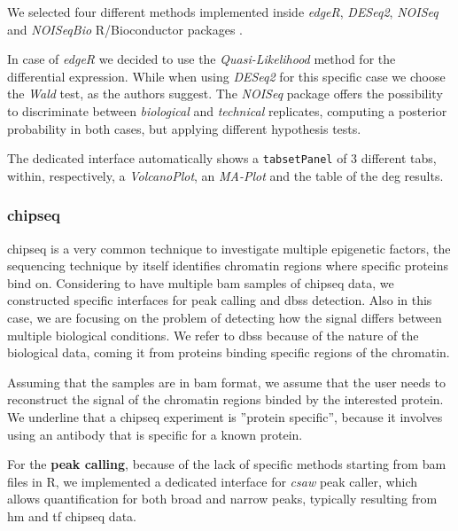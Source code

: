 We selected four different methods implemented inside \textit{edgeR}, \textit{DESeq2}, \textit{NOISeq} and \textit{NOISeqBio} R/Bioconductor packages \cite{Robinson2009, Love2014,Tarazona2012}.

In case of \textit{edgeR} we decided to use the \textit{Quasi-Likelihood} method for the differential expression.
While when using \textit{DESeq2} for this specific case we choose the \textit{Wald} test, as the authors suggest.
The \textit{NOISeq} package offers the possibility to discriminate between \textit{biological} and \textit{technical} replicates, computing a posterior probability in both cases, but applying different hypothesis tests.

The dedicated interface automatically shows a \lstinline!tabsetPanel! of 3 different tabs, within, respectively, a \textit{VolcanoPlot}, an \textit{MA-Plot} and the table of the \gls{deg} results.


\subsubsection{\gls{chipseq}} \label{sec:integrhochip}
\gls{chipseq} is a very common technique to investigate multiple epigenetic factors, the sequencing technique by itself identifies chromatin regions where specific proteins bind on.
Considering to have multiple \gls{bam} samples of \gls{chipseq} data, we constructed specific interfaces for peak calling and \glspl{dbs} detection.
Also in this case, we are focusing on the problem of detecting how the signal differs between multiple biological conditions.
We refer to \glspl{dbs} because of the nature of the biological data, coming it from proteins binding specific regions of the chromatin.


Assuming that the samples are in \gls{bam} format, we assume that the user needs to reconstruct the signal of the chromatin regions binded by the interested protein.
We underline that a \gls{chipseq} experiment is ''protein specific'', because it involves using an antibody that is specific for a known protein.

For the \textbf{peak calling}, because of the lack of specific methods starting from \gls{bam} files in R, we implemented a dedicated interface for \textit{csaw} \cite{Lun2015} peak caller, which allows quantification for both broad and narrow peaks, typically resulting from \gls{hm} and \gls{tf} \gls{chipseq} data.

